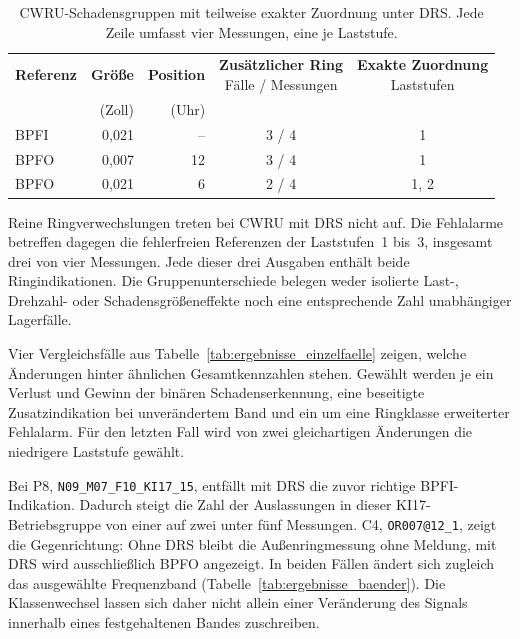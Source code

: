 \begin{table}[htbp]
  \centering
  \caption{CWRU-Schadensgruppen mit teilweise exakter Zuordnung unter DRS.
    Jede Zeile umfasst vier Messungen, eine je Laststufe.}
  \label{tab:fehleranalyse_cwru}
  \small
  \begin{tabular}{lrrcc}
    \hline
    \textbf{Referenz} & \textbf{Größe} & \textbf{Position} &
      \shortstack{\textbf{Zusätzlicher Ring}\\Fälle / Messungen} &
      \shortstack{\textbf{Exakte Zuordnung}\\Laststufen} \\
    & (Zoll) & (Uhr) & & \\
    \hline
    BPFI & 0,021 & -- & 3 / 4 & 1 \\
    BPFO & 0,007 & 12 & 3 / 4 & 1 \\
    BPFO & 0,021 & 6 & 2 / 4 & 1, 2 \\
    \hline
  \end{tabular}
\end{table}

Reine Ringverwechslungen treten bei CWRU mit DRS nicht auf. Die Fehlalarme
betreffen dagegen die fehlerfreien Referenzen der Laststufen~1 bis~3,
insgesamt drei von vier Messungen. Jede dieser drei Ausgaben enthält beide
Ringindikationen. Die Gruppenunterschiede belegen weder isolierte Last-,
Drehzahl- oder Schadensgrößeneffekte noch eine entsprechende Zahl unabhängiger
Lagerfälle.


Vier Vergleichsfälle aus Tabelle~\ref{tab:ergebnisse_einzelfaelle} zeigen,
welche Änderungen hinter ähnlichen Gesamtkennzahlen stehen. Gewählt werden
je ein Verlust und Gewinn der binären Schadenserkennung, eine beseitigte
Zusatzindikation bei unverändertem Band und ein um eine Ringklasse
erweiterter Fehlalarm. Für den letzten Fall wird von zwei gleichartigen
Änderungen die niedrigere Laststufe gewählt.

Bei P8, \texttt{N09\_M07\_F10\_KI17\_15}, entfällt mit DRS die zuvor richtige
BPFI-Indikation. Dadurch steigt die Zahl der Auslassungen in dieser
KI17-Betriebsgruppe von einer auf zwei unter fünf Messungen.
C4, \texttt{OR007@12\_1}, zeigt die Gegenrichtung: Ohne DRS bleibt die
Außenringmessung ohne Meldung, mit DRS wird ausschließlich BPFO angezeigt.
In beiden Fällen ändert sich zugleich das ausgewählte Frequenzband
(Tabelle~\ref{tab:ergebnisse_baender}). Die Klassenwechsel lassen sich daher
nicht allein einer Veränderung des Signals innerhalb eines festgehaltenen
Bandes zuschreiben.


